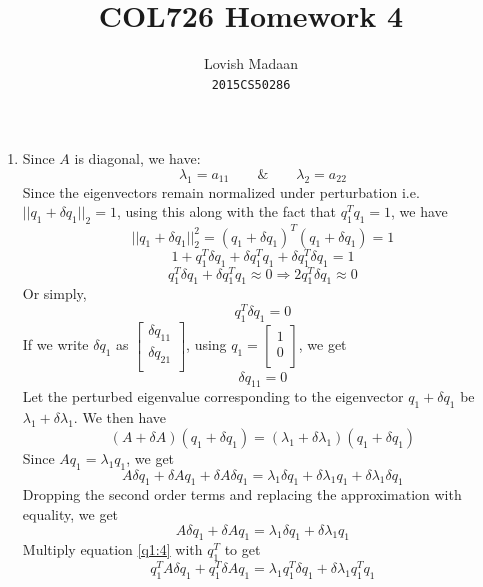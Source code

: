 \documentclass{article}
\title{COL726 Homework 4}
\author{Lovish Madaan \\ \texttt{2015CS50286}}
\date{}
\begin{document}
\maketitle

\begin{enumerate}
    \item Since $A$ is diagonal, we have:
    \begin{equation}
    \lambda_1 = a_{11} \qquad \& \qquad \lambda_2 = a_{22}
    \label{q1:1}
    \end{equation}
    Since the eigenvectors remain normalized under perturbation i.e. $||q_1 + \delta q_1||_2 = 1$, using this along with the fact that $q_1^Tq_1 = 1$, we have
    $$||q_1 + \delta q_1||_2^2 = (q_1 + \delta q_1)^T(q_1 + \delta q_1) = 1$$
    $$1 +  q_1^T\delta q_1 + \delta q_1^Tq_1 + \delta q_1^T\delta q_1 = 1$$
    $$q_1^T\delta q_1 + \delta q_1^Tq_1 \approx 0 \Rightarrow 2q_1^T\delta q_1 \approx 0$$
    Or simply,
    \begin{equation}
    q_1^T\delta q_1 = 0
    \label{q1:2}
    \end{equation}
    If we write $\delta q_1$ as $\begin{bmatrix}
        \delta q_{11} \\
        \delta q_{21} \\
    \end{bmatrix}$, using $q_1 = \begin{bmatrix}
        1\\
        0\\
    \end{bmatrix}$, we get
    \begin{equation}
    \delta q_{11} = 0
    \label{q1:3}
    \end{equation}
    Let the perturbed eigenvalue corresponding to the eigenvector $q_1 + \delta q_1$ be $\lambda_1 + \delta \lambda_1$. We then have
    $$(A + \delta A)(q_1 + \delta q_1) = (\lambda_1 + \delta \lambda_1)(q_1 + \delta q_1)$$
    Since $Aq_1 = \lambda_1q_1$, we get
    $$A\delta q_1 + \delta Aq_1 + \delta A\delta q_1 = \lambda_1\delta q_1 + \delta \lambda_1q_1 + \delta\lambda_1\delta q_1$$
    Dropping the second order terms and replacing the approximation with equality, we get
    \begin{equation}
    A\delta q_1 + \delta Aq_1 = \lambda_1\delta q_1 + \delta\lambda_1q_1
    \label{q1:4}
    \end{equation}
    Multiply equation \ref{q1:4} with $q_1^T$ to get
    $$q_1^TA\delta q_1 + q_1^T\delta Aq_1 = \lambda_1q_1^T\delta q_1 + \delta\lambda_1q_1^Tq_1$$

\end{enumerate}
\end{document}
